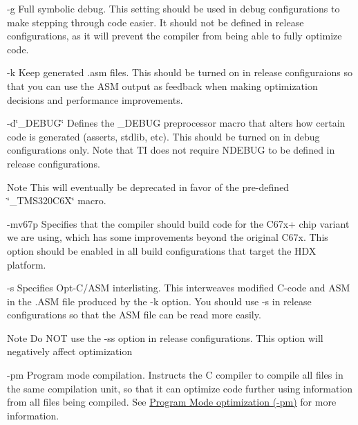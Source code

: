 \begin{DoxyItemize}
\item {\ttfamily -\/g}  Full symbolic debug. This setting should be used in debug configurations to make stepping through code easier. It should not be defined in release configurations, as it will prevent the compiler from being able to fully optimize code.  


\item {\ttfamily -\/k}  Keep generated .asm files. This should be turned on in release configuraions so that you can use the A\+S\+M output as feedback when making optimization decisions and performance improvements.  


\item {\ttfamily -\/d\char`\"{}\+\_\+\+D\+E\+B\+U\+G\char`\"{}}  Defines the {\ttfamily \+\_\+\+D\+E\+B\+U\+G} preprocessor macro that alters how certain code is generated (asserts, stdlib, etc). This should be turned on in debug configurations only. Note that T\+I does not require N\+D\+E\+B\+U\+G to be defined in release configurations.

\begin{DoxyNote}{Note}
This will eventually be deprecated in favor of the pre-\/defined \char`\"{}\+\_\+\+T\+M\+S320\+C6\+X\char`\"{} macro.
\end{DoxyNote}
 


\item {\ttfamily -\/mv67p}  Specifies that the compiler should build code for the C67x+ chip variant we are using, which has some improvements beyond the original C67x. This option should be enabled in all build configurations that target the H\+D\+X platform.  


\item {\ttfamily -\/s}  Specifies Opt-\/\+C/\+A\+S\+M interlisting. This interweaves modified C-\/code and A\+S\+M in the .A\+S\+M file produced by the {\ttfamily -\/k} option. You should use {\ttfamily -\/s} in release configurations so that the A\+S\+M file can be read more easily.

\begin{DoxyNote}{Note}
Do N\+O\+T use the {\ttfamily -\/ss} option in release configurations. This option will negatively affect optimization
\end{DoxyNote}
 


\item {\ttfamily -\/pm}  Program mode compilation. Instructs the C compiler to compile all files in the same compilation unit, so that it can optimize code further using information from all files being compiled. See \hyperlink{a00362_subsubsection__program_mode_optimization_pm_}{Program Mode optimization (-\/pm)} for more information.  



\end{DoxyItemize}
